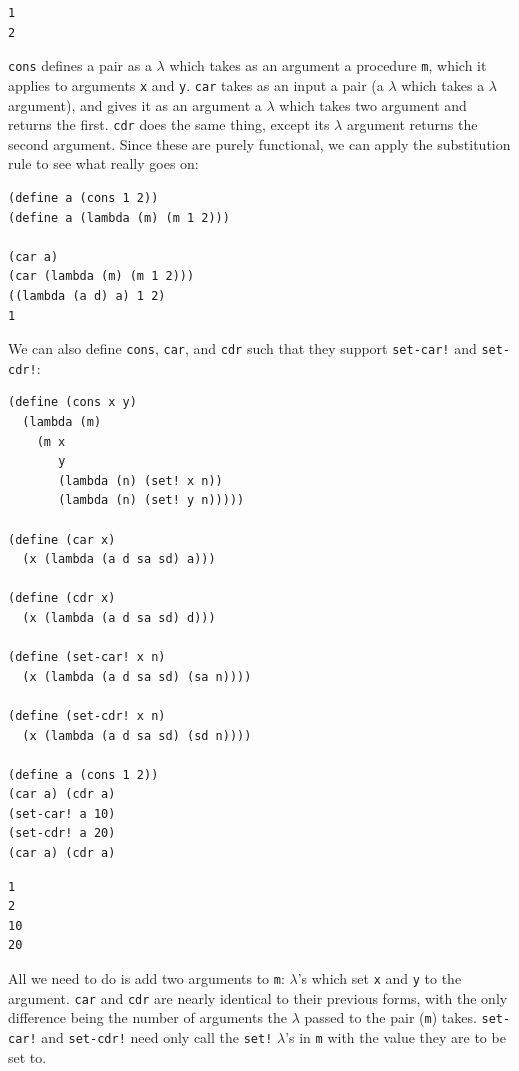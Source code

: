 \documentclass[9pt]{report}
\begin{document}
\begin{verbatim}
1
2
\end{verbatim}


\texttt{cons} defines a pair as a \(\lambda\) which takes as an argument a
procedure \texttt{m}, which it applies to arguments \texttt{x} and \texttt{y}. \texttt{car}
takes as an input a pair (a \(\lambda\) which takes a \(\lambda\)
argument), and gives it as an argument a \(\lambda\) which takes two
argument and returns the first. \texttt{cdr} does the same thing, except
its \(\lambda\) argument returns the second argument. Since these are
purely functional, we can apply the substitution rule to see what
really goes on:

\begin{verbatim}
(define a (cons 1 2))
(define a (lambda (m) (m 1 2)))

(car a)
(car (lambda (m) (m 1 2)))
((lambda (a d) a) 1 2)
1
\end{verbatim}

We can also define \texttt{cons}, \texttt{car}, and \texttt{cdr} such that they support
\texttt{set-car!} and \texttt{set-cdr!}:

\begin{verbatim}
(define (cons x y)
  (lambda (m)
    (m x
       y
       (lambda (n) (set! x n))
       (lambda (n) (set! y n)))))

(define (car x)
  (x (lambda (a d sa sd) a)))

(define (cdr x)
  (x (lambda (a d sa sd) d)))

(define (set-car! x n)
  (x (lambda (a d sa sd) (sa n))))

(define (set-cdr! x n)
  (x (lambda (a d sa sd) (sd n))))

(define a (cons 1 2))
(car a) (cdr a)
(set-car! a 10)
(set-cdr! a 20)
(car a) (cdr a)
\end{verbatim}

\begin{verbatim}
1
2
10
20
\end{verbatim}


All we need to do is add two arguments to \texttt{m}: \(\lambda\)'s which set
\texttt{x} and \texttt{y} to the argument. \texttt{car} and \texttt{cdr} are nearly identical to their
previous forms, with the only difference being the number of
arguments the \(\lambda\) passed to the pair (\texttt{m}) takes. \texttt{set-car!}
and \texttt{set-cdr!} need only call the \texttt{set!} \(\lambda\)'s in \texttt{m} with the
value they are to be set to.
\end{document}
